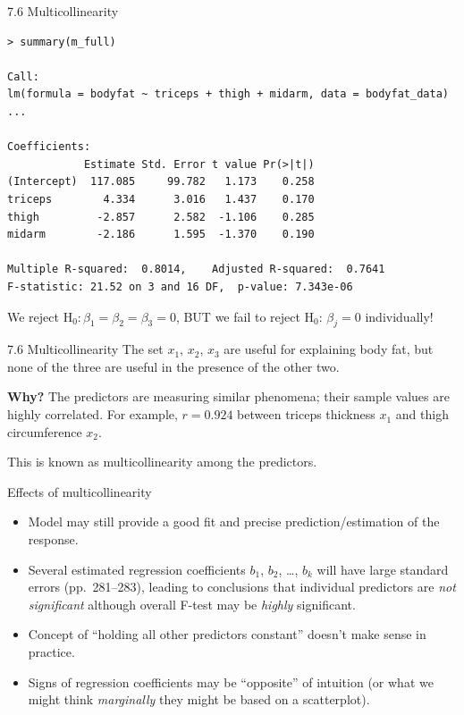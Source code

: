 \documentclass{beamer}
\begin{document}
\begin{frame}[fragile]{7.6 Multicollinearity}
\begin{footnotesize}
\begin{verbatim}
> summary(m_full)

Call:
lm(formula = bodyfat ~ triceps + thigh + midarm, data = bodyfat_data)
...

Coefficients:
            Estimate Std. Error t value Pr(>|t|)
(Intercept)  117.085     99.782   1.173    0.258
triceps        4.334      3.016   1.437    0.170
thigh         -2.857      2.582  -1.106    0.285
midarm        -2.186      1.595  -1.370    0.190

Multiple R-squared:  0.8014,	Adjusted R-squared:  0.7641 
F-statistic: 21.52 on 3 and 16 DF,  p-value: 7.343e-06
\end{verbatim}
\end{footnotesize}

\pause We reject
H$_0: \beta_1 = \beta_2 = \beta_3 = 0$, BUT we fail to reject $\text{H}_0:\,\beta_j=0$ individually!
\end{frame}

\begin{frame}{7.6 Multicollinearity}
The set $x_1$, $x_2$, $x_3$ are useful for explaining body fat, but none of
the three are useful in the presence of the other two.
\vspace{10pt}

\textbf{Why?} \pause The predictors are measuring similar phenomena; their
sample values are highly correlated. \pause For example, $r = 0.924$ between triceps thickness $x_1$ and thigh circumference $x_2$.
\vspace{10pt}

\pause This is known as \alert{multicollinearity} among the predictors.
\end{frame}

\begin{frame}{Effects of multicollinearity}
\begin{itemize}
\item<2-> Model may still provide a good fit and precise
prediction/estimation of the response.
\item<3-> Several estimated regression coefficients $b_1$, $b_2$, \ldots , $b_k$ will
have large standard errors (pp.~281--283), leading to conclusions that
individual predictors are \textit{not significant} although overall F-test
may be \textit{highly} significant.
\item<4-> Concept of ``holding all other predictors constant'' doesn’t
make sense in practice.
\item<5-> Signs of regression coefficients may be ``opposite'' of intuition
(or what we might think \textit{marginally} they might be based on a scatterplot).
\end{itemize}
\end{frame}
\end{document}
